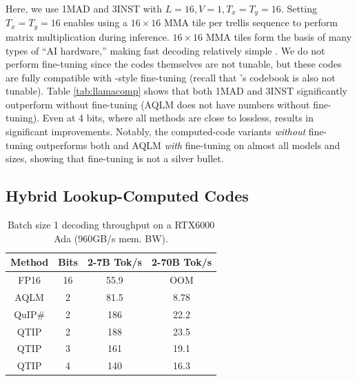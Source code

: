 Here, we use 1MAD and 3INST with $L=16, V=1, T_x = T_y=16$.
Setting $T_x = T_y = 16$ enables using a $16\times16$ MMA tile per trellis sequence to perform matrix multiplication during inference.
$16 \times 16$ MMA tiles form the basis of many types of ``AI hardware,'' making fast decoding relatively simple \cite{9361255}.
We do not perform fine-tuning since the codes themselves are not tunable, but these codes are fully compatible with \qs-style fine-tuning (recall that \qs's codebook is also not tunable).
Table \ref{tab:llamacomp} shows that both 1MAD and 3INST significantly outperform \qss without fine-tuning (AQLM does not have numbers without fine-tuning).
Even at 4 bits, where all methods are close to lossless, \qts results in significant improvements.
Notably, the computed-code \qts variants \textit{without} fine-tuning outperforms both \qss and AQLM \textit{with} fine-tuning on almost all models and sizes, showing that fine-tuning is not a silver bullet.

\subsection{Hybrid Lookup-Computed Codes}
\begin{table}
\caption{Batch size 1 decoding throughput on a RTX6000 Ada (960GB/s mem. BW).}
\small\sc
\centering
\tabcolsep=0.1cm
\begin{tabular}{@{}cccc@{}}
\toprule
Method & Bits & 2-7B Tok/s & 2-70B Tok/s \\ \midrule
FP16   & 16   & 55.9       & OOM         \\
AQLM   & 2    & 81.5       & 8.78        \\
QuIP\#  & 2    & 186        & 22.2        \\
\rowcolor[HTML]{D9D9D9} 
QTIP   & 2    & 188        & 23.5        \\
\rowcolor[HTML]{D9D9D9} 
QTIP   & 3    & 161        & 19.1        \\
\rowcolor[HTML]{D9D9D9} 
QTIP   & 4    & 140        & 16.3        \\ \bottomrule
\end{tabular}
\label{tab:genspeed}
\end{table}

\label{sec:hybres}






